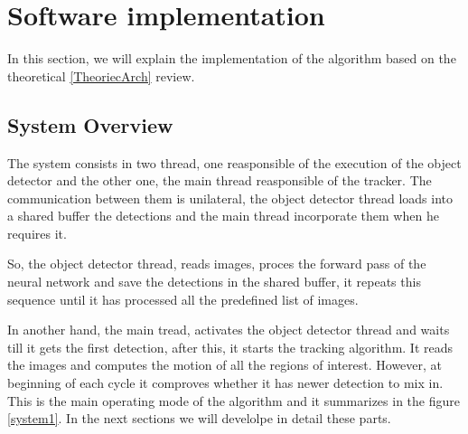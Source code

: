 \documentclass[12pt, a4paper, titlepage,twoside,openright]{article}
\begin{document}
\section{Software implementation}

In this section, we will explain the implementation of the algorithm based on the theoretical \ref{TheoriecArch} review.

\subsection{System Overview}


The system consists in two thread, one reasponsible of the execution of the object detector and the other one, the main thread reasponsible of the tracker. The communication between them is unilateral, the object detector thread loads into a shared buffer the detections and the main thread incorporate them when he requires it.

So, the object detector thread, reads images, proces the forward pass of the neural network and save the detections in the shared buffer, it repeats this sequence until it has processed all the predefined list of images.

In another hand, the main tread, activates the object detector thread and waits till it gets the first detection, after this, it starts the tracking algorithm. It reads the images and computes the motion of all the regions of interest. However, at beginning of each cycle it comproves whether it has newer detection to mix in. This is the main operating mode of the algorithm and it summarizes in the figure \ref{system1}. In the next sections we will develolpe in detail these parts. 
\end{document}
